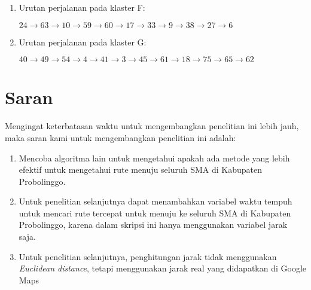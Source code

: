 \begin{enumerate}
\begin{enumerate}
\item Urutan perjalanan pada klaster F:

$24\rightarrow63\rightarrow10\rightarrow59\rightarrow60\rightarrow17\rightarrow33\rightarrow9\rightarrow38\rightarrow27\rightarrow6$

\item Urutan perjalanan pada klaster G:

$40\rightarrow49\rightarrow54\rightarrow4\rightarrow41\rightarrow3\rightarrow45\rightarrow61\rightarrow18\rightarrow75\rightarrow65\rightarrow62$

\end{enumerate}

\end{enumerate}

\section{Saran}

Mengingat keterbatasan waktu untuk mengembangkan penelitian ini lebih jauh, maka saran kami untuk mengembangkan penelitian ini adalah:
\begin{enumerate}
    \item Mencoba algoritma lain untuk mengetahui apakah ada metode yang lebih efektif untuk mengetahui rute menuju seluruh SMA di Kabupaten Probolinggo.
    \item Untuk penelitian selanjutnya dapat menambahkan variabel waktu tempuh untuk mencari rute tercepat untuk menuju ke seluruh SMA di Kabupaten Probolinggo, karena dalam skripsi ini hanya menggunakan variabel jarak saja.
    \item Untuk penelitian selanjutnya, penghitungan jarak tidak menggunakan \textit{Euclidean distance}, tetapi menggunakan jarak real yang didapatkan di Google Maps
\end{enumerate}